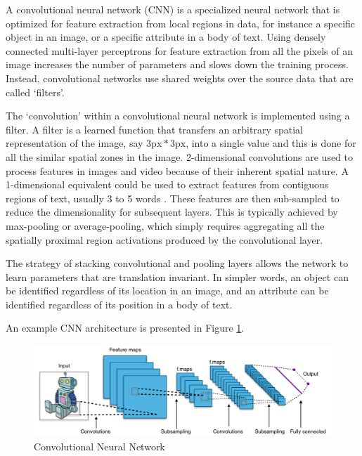A convolutional neural network (CNN) \citep{lecun1995convolutional} is a specialized neural network that is optimized for feature extraction from local regions in data, for instance a specific object in an image, or a specific attribute in a body of text. Using densely connected multi-layer perceptrons for feature extraction from all the pixels of an image increases the number of parameters and slows down the training process. Instead, convolutional networks use shared weights over the source data that are called `filters'.

The `convolution' within a convolutional neural network is implemented using a filter. A filter is a learned function that transfers an arbitrary spatial representation of the image, say $3\text{px} * 3\text{px}$, into a single value and this is done for all the similar spatial zones in the image. 2-dimensional convolutions are used to process features in images and video because of their inherent spatial nature. A 1-dimensional equivalent could be used to extract features from contiguous regions of text, usually 3 to 5 words \citep{kim2014convolutional}. These features are then sub-sampled to reduce the dimensionality for subsequent layers. This is typically achieved by max-pooling or average-pooling, which simply requires aggregating all the spatially proximal region activations produced by the convolutional layer.

The strategy of stacking convolutional and pooling layers allows the network to learn parameters that are translation invariant. In simpler words, an object can be identified regardless of its location in an image, and an attribute can be identified regardless of its position in a body of text.

An example CNN architecture is presented in Figure \ref{fig:cnn}.

\begin{figure}[ht]
	\centering
	\includegraphics[width=\textwidth]{images/cnn}
	\caption{\label{fig:cnn} Convolutional Neural Network}
\end{figure}

